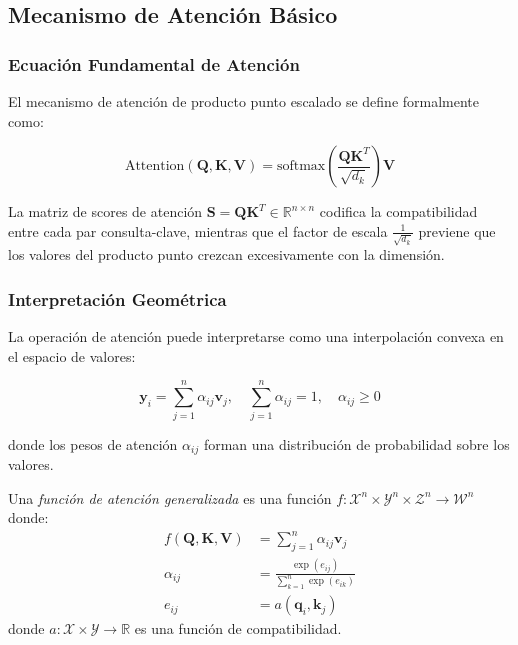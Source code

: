 \subsection{Mecanismo de Atención Básico}\label{subsec:atencion_basico}

\subsubsection{Ecuación Fundamental de Atención}

El mecanismo de atención de producto punto escalado se define formalmente como:

\begin{equation}
    \text{Attention}(\mathbf{Q}, \mathbf{K}, \mathbf{V}) = \text{softmax}\left(\frac{\mathbf{Q}\mathbf{K}^T}{\sqrt{d_k}}\right)\mathbf{V}
    \label{eq:scaled_dot_product_attention}
\end{equation}

La matriz de scores de atención $\mathbf{S} = \mathbf{Q}\mathbf{K}^T \in \mathbb{R}^{n \times n}$ codifica la compatibilidad entre cada par consulta-clave, mientras que el factor de escala $\frac{1}{\sqrt{d_k}}$ previene que los valores del producto punto crezcan excesivamente con la dimensión.

\subsubsection{Interpretación Geométrica}

La operación de atención puede interpretarse como una interpolación convexa en el espacio de valores:

\begin{equation}
    \mathbf{y}_i = \sum_{j=1}^{n} \alpha_{ij} \mathbf{v}_j, \quad \sum_{j=1}^{n} \alpha_{ij} = 1, \quad \alpha_{ij} \geq 0
    \label{eq:convex_combination}
\end{equation}

donde los pesos de atención $\alpha_{ij}$ forman una distribución de probabilidad sobre los valores.

\begin{definition}\label{def:generalized_attention}
    Una \textit{función de atención generalizada} es una función $f: \mathcal{X}^n \times \mathcal{Y}^n \times \mathcal{Z}^n \to \mathcal{W}^n$ donde:
    \begin{align}
        f(\mathbf{Q}, \mathbf{K}, \mathbf{V}) &= \sum_{j=1}^{n} \alpha_{ij} \mathbf{v}_j \\
        \alpha_{ij} &= \frac{\exp(e_{ij})}{\sum_{k=1}^{n} \exp(e_{ik})} \\
        e_{ij} &= a(\mathbf{q}_i, \mathbf{k}_j)
    \end{align}
    donde $a: \mathcal{X} \times \mathcal{Y} \to \mathbb{R}$ es una función de compatibilidad.
\end{definition}

